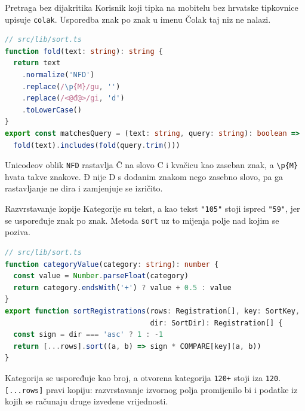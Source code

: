 \begin{frame}[fragile]{Pretraga bez dijakritika}
Korisnik koji tipka na mobitelu bez hrvatske tipkovnice upisuje \texttt{colak}. Usporedba znak po znak u imenu Čolak taj niz ne nalazi.

\begin{lstlisting}[language=typescript]
// src/lib/sort.ts
function fold(text: string): string {
  return text
    .normalize('NFD')
    .replace(/\p{M}/gu, '')
    .replace(/<@đ@>/gi, 'd')
    .toLowerCase()
}
export const matchesQuery = (text: string, query: string): boolean =>
  fold(text).includes(fold(query.trim()))
\end{lstlisting}

\vspace{0.2em}
Unicodeov oblik \texttt{NFD} rastavlja Č na slovo C i kvačicu kao zaseban znak, a \texttt{\textbackslash p\{M\}} hvata takve znakove. Đ nije D s dodanim znakom nego zasebno slovo, pa ga rastavljanje ne dira i zamjenjuje se izričito.
\end{frame}

\begin{frame}[fragile]{Razvrstavanje kopije}
Kategorije su tekst, a kao tekst \texttt{"105"} stoji ispred \texttt{"59"}, jer se uspoređuje znak po znak. Metoda \texttt{sort} uz to mijenja polje nad kojim se poziva.

\begin{lstlisting}[language=typescript]
// src/lib/sort.ts
function categoryValue(category: string): number {
  const value = Number.parseFloat(category)
  return category.endsWith('+') ? value + 0.5 : value
}
export function sortRegistrations(rows: Registration[], key: SortKey,
                                  dir: SortDir): Registration[] {
  const sign = dir === 'asc' ? 1 : -1
  return [...rows].sort((a, b) => sign * COMPARE[key](a, b))
}
\end{lstlisting}

\vspace{0.2em}
Kategorija se uspoređuje kao broj, a otvorena kategorija \texttt{120+} stoji iza \texttt{120}. \texttt{[...rows]} pravi kopiju: razvrstavanje izvornog polja promijenilo bi i podatke iz kojih se računaju druge izvedene vrijednosti.
\end{frame}

